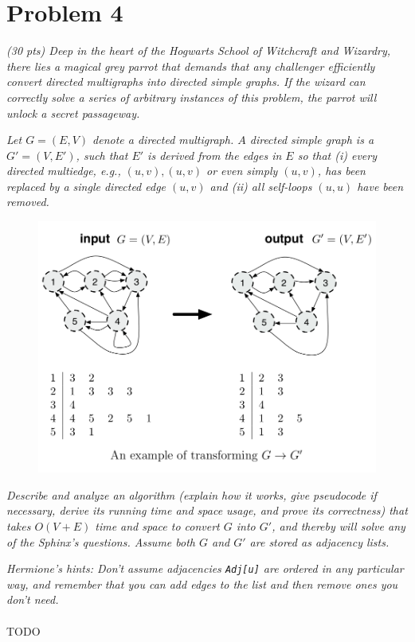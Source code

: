 \documentclass[12pt]{article} \setlength{\oddsidemargin}{0in}
\begin{document}
\section*{Problem 4}

\textit{(30 pts) Deep in the heart of the Hogwarts School of
  Witchcraft and Wizardry, there lies a magical grey parrot that
  demands that any challenger efficiently convert directed multigraphs
  into directed simple graphs. If the wizard can correctly solve a
  series of arbitrary instances of this problem, the parrot will
  unlock a secret passageway.}

\textit{Let $G = (E, V)$ denote a directed multigraph. $A$ directed
  simple graph is a $G' = (V, E')$, such that $E'$ is derived from the
  edges in $E$ so that (i) every directed multiedge, e.g.,
  ${(u, v), (u, v)}$ or even simply ${(u, v)}$, has been replaced by a
  single directed edge ${(u, v)}$ and (ii) all self-loops $(u, u)$
  have been removed.}

\begin{figure}[h]
  \centering \includegraphics[width=1\textwidth]{P4}
\end{figure}

\textit{Describe and analyze an algorithm (explain how it works, give
  pseudocode if necessary, derive its running time and space usage,
  and prove its correctness) that takes $O(V + E)$ time and space to
  convert $G$ into $G'$, and thereby will solve any of the Sphinx’s
  questions. Assume both $G$ and $G'$ are stored as adjacency lists.}

\textit{Hermione’s hints: Don’t assume adjacencies \texttt{Adj[u]} are
  ordered in any particular way, and remember that you can add edges
  to the list and then remove ones you don't need.}
\\\\
TODO
\end{document}
